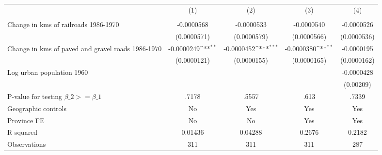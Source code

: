 {
\def\sym#1{\ifmmode^{#1}\else\(^{#1}\)\fi}
\begin{tabular}{l*{4}{c}}
\hline\hline
                &\multicolumn{1}{c}{(1)}&\multicolumn{1}{c}{(2)}&\multicolumn{1}{c}{(3)}&\multicolumn{1}{c}{(4)}\\
                &\multicolumn{1}{c}{}&\multicolumn{1}{c}{}&\multicolumn{1}{c}{}&\multicolumn{1}{c}{}\\
\hline
Change in kms of railroads 1986-1970&-0.0000568         &-0.0000533         &-0.0000540         &-0.0000526         \\
                &(0.0000571)         &(0.0000579)         &(0.0000566)         &(0.0000536)         \\
[1em]
Change in kms of paved and gravel roads 1986-1970&-0.0000249\sym{**} &-0.0000452\sym{***}&-0.0000380\sym{**} &-0.0000195         \\
                &(0.0000121)         &(0.0000155)         &(0.0000165)         &(0.0000162)         \\
[1em]
Log urban population 1960&                  &                  &                  &-0.0000428         \\
                &                  &                  &                  &(0.00209)         \\
\hline
P-value for testing $\beta\_{2} >= \beta\_{1}$&    .7178         &    .5557         &     .613         &    .7339         \\
Geographic controls&       No         &      Yes         &      Yes         &      Yes         \\
Province FE     &       No         &       No         &      Yes         &      Yes         \\
R-squared       &  0.01436         &  0.04288         &   0.2676         &   0.2182         \\
Observations    &      311         &      311         &      311         &      287         \\
\hline\hline
\end{tabular}
}
